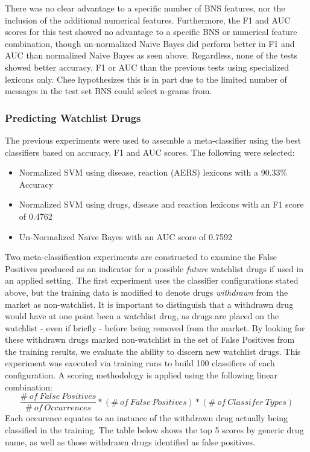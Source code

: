 \documentclass[twoside,11pt]{article}
\begin{document}
There was no clear advantage to a specific number of BNS features, nor the inclusion of the additional numerical features.  Furthermore, the F1 and AUC scores for this test showed no advantage to a specific BNS or numerical feature combination, though un-normalized Naive Bayes did perform better in F1 and AUC than normalized Naive Bayes as seen above. Regardless, none of the tests showed better accuracy, F1 or AUC than the previous tests using specialized lexicons only. Chee hypothesizes this is in part due to the limited number of messages in the test set BNS could select n-grams from.

\subsubsection{Predicting Watchlist Drugs}
The previous experiments were used to assemble a meta-classifier using the best classifiers based on accuracy, F1 and AUC scores. The following were selected:
\begin{itemize}
  \item Normalized SVM using disease, reaction (AERS) lexicons with a 90.33\% Accuracy
  \item Normalized SVM using drugs, disease and reaction lexicons with an F1 score of 0.4762
  \item Un-Normalized Na\"ive Bayes with an AUC score of 0.7592
\end{itemize}
Two meta-classification experiments are constructed to examine the False Positives produced as an indicator for a possible \textit{future} watchlist drugs if used in an applied setting. The first experiment uses the classifier configurations stated above, but the training data is modified to denote drugs \textit{withdrawn} from the market as non-watchlist. It is important to distinguish that a withdrawn drug would have at one point been a watchlist drug, as drugs are placed on the watchlist - even if briefly - before being removed from the market. By looking for these withdrawn drugs marked non-watchlist in the set of False Positives from the training results, we evaluate the ability to discern new watchlist drugs. This experiment was executed via training runs to build 100 classifiers of each configuration. A scoring methodology is applied using the following linear combination:
\[
  \frac{\#\ of\ False\ Positives}{\#\ of\ Occurrences} * (\#\ of\ False\ Positives) * (\#\ of\ Classifer\ Types)
\]
Each occurence equates to an instance of the withdrawn drug actually being classified in the training. The table below shows the top 5 scores by generic drug name, as well as those withdrawn drugs identified as false positives.
\end{document}
